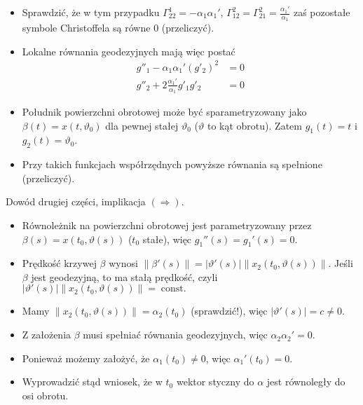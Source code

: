 \begin{frame}
\begin{itemize}
\item Sprawdzić, że w tym przypadku $\Gamma_{22}^1=-\alpha_1\alpha_1'$, $\Gamma_{12}^2=\Gamma_{21}^2=\frac{\alpha_1'}{\alpha_1}$ zaś pozostałe symbole Christoffela są równe $0$ (przeliczyć).
\pause \item Lokalne równania geodezyjnych mają więc postać
\begin{align*}
g''_1-\alpha_1\alpha_1'(g'_2)^2&=0\\
g''_2+2\frac{\alpha_1'}{\alpha_1}g'_1g'_2&=0
\end{align*}\vspace*{-0.2in}
\pause \item Południk powierzchni obrotowej może być sparametryzowany jako 
$\beta(t)=x(t,\vartheta_0)$ dla pewnej stałej $\vartheta_0$ ($\vartheta$ to kąt 
obrotu). Zatem $g_1(t)=t$ i $g_2(t)=\vartheta_0$.
\pause \item Przy takich funkcjach współrzędnych powyższe równania są spełnione (przeliczyć).
\end{itemize}
\bigskip
\end{frame}
\begin{frame}
Dowód drugiej części, implikacja $(\Rightarrow)$.
\begin{itemize}[<+->]
\item Równoleżnik na powierzchni obrotowej jest parametryzowany przez $\beta(s)=x(t_0,\vartheta(s))$ ($t_0$ stałe), więc $g_1''(s)=g_1'(s)=0$.
\item Prędkość krzywej $\beta$ wynosi $\|\beta'(s)\|=|\vartheta'(s)|\|x_2(t_0,\vartheta(s))\|$. Jeśli $\beta$ jest geodezyjną, to ma stałą prędkość, czyli $|\vartheta'(s)|\|x_2(t_0,\vartheta(s))\|=\operatorname{const.}$
\item Mamy $\|x_2(t_0,\vartheta(s))\|=\alpha_2(t_0)$ (sprawdzić!), więc $|\vartheta'(s)|=c\neq 0$.
\item Z założenia $\beta$ musi spełniać równania geodezyjnych, więc $\alpha_2\alpha_2'=0$. 
\item Ponieważ możemy założyć, że $\alpha_1(t_0)\neq 0$, więc $\alpha_1'(t_0)=0$.
\item Wyprowadzić stąd wniosek, że w $t_0$ wektor styczny do $\alpha$ jest równoległy do osi obrotu.
\end{itemize}
\end{frame}
\bigskip
